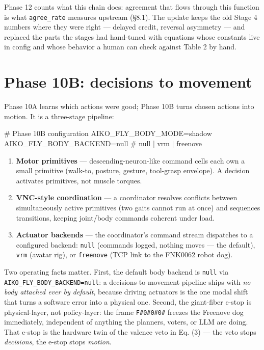 \documentclass[11pt]{article}
\begin{document}
Phase 12 counts what this chain does: agreement that flows through this function is what \texttt{agree\_rate} measures upstream (§8.1). The update keeps the old Stage 4 numbers where they were right — delayed credit, reversal asymmetry — and replaced the parts the stages had hand-tuned with equations whose constants live in config and whose behavior a human can check against Table 2 by hand.

\section{Phase 10B: decisions to movement}

Phase 10A learns which actions were good; Phase 10B turns chosen actions into motion. It is a three-stage pipeline:

\begin{CodeBlock}
# Phase 10B configuration
AIKO_FLY_BODY_MODE=shadow
AIKO_FLY_BODY_BACKEND=null   # null | vrm | freenove
\end{CodeBlock}

\begin{enumerate}[leftmargin=*]
\item \textbf{Motor primitives} — descending-neuron-like command cells each own a small primitive (walk-to, posture, gesture, tool-grasp envelope). A decision activates primitives, not muscle torques.
\item \textbf{VNC-style coordination} — a coordinator resolves conflicts between simultaneously active primitives (two gaits cannot run at once) and sequences transitions, keeping joint/body commands coherent under load.
\item \textbf{Actuator backends} — the coordinator's command stream dispatches to a configured backend: \texttt{null} (commands logged, nothing moves — the default), \texttt{vrm} (avatar rig), or \texttt{freenove} (TCP link to the FNK0062 robot dog).
\end{enumerate}

Two operating facts matter. First, the default body backend is \texttt{null} via \texttt{AIKO\_FLY\_BODY\_BACKEND=null}: a decisions-to-movement pipeline ships with \emph{no body attached ever by default}, because driving actuators is the one modal shift that turns a software error into a physical one. Second, the giant-fiber e-stop is physical-layer, not policy-layer: the frame \texttt{F\#0\#0\#0\#} freezes the Freenove dog immediately, independent of anything the planners, voters, or LLM are doing. That e-stop is the hardware twin of the valence veto in Eq. (3) — the veto stops \emph{decisions}, the e-stop stops \emph{motion}.
\end{document}
